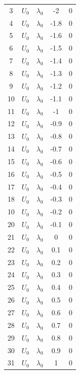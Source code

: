 \documentclass[12pt,letterpaper]{scrreprt}
\begin{document}
\begin{appendices}
\begin{table}[!ht]
{\begin{tabular}{c|c|c|c|c}
3   & $U_0$        & $\lambda_0$ & -2    & 0   \\
4   & $U_0$        & $\lambda_0$ & -1.8  & 0   \\
5   & $U_0$        & $\lambda_0$ & -1.6  & 0   \\
6   & $U_0$        & $\lambda_0$ & -1.5  & 0   \\
7   & $U_0$        & $\lambda_0$ & -1.4  & 0   \\
8   & $U_0$        & $\lambda_0$ & -1.3  & 0   \\
9  & $U_0$        & $\lambda_0$ & -1.2  & 0   \\
10  & $U_0$        & $\lambda_0$ & -1.1  & 0   \\
11  & $U_0$        & $\lambda_0$ & -1    & 0   \\
12  & $U_0$        & $\lambda_0$ & -0.9  & 0   \\
13  & $U_0$        & $\lambda_0$ & -0.8  & 0   \\
14  & $U_0$        & $\lambda_0$ & -0.7  & 0   \\
15  & $U_0$        & $\lambda_0$ & -0.6  & 0   \\
16  & $U_0$        & $\lambda_0$ & -0.5  & 0   \\
17  & $U_0$        & $\lambda_0$ & -0.4  & 0   \\
18  & $U_0$        & $\lambda_0$ & -0.3  & 0   \\
10  & $U_0$        & $\lambda_0$ & -0.2  & 0   \\
20  & $U_0$        & $\lambda_0$ & -0.1  & 0   \\
21  & $U_0$        & $\lambda_0$ & 0     & 0   \\
22 & $U_0$        & $\lambda_0$ & 0.1   & 0   \\
23  & $U_0$        & $\lambda_0$ & 0.2   & 0   \\
24  & $U_0$        & $\lambda_0$ & 0.3   & 0   \\
25  & $U_0$        & $\lambda_0$ & 0.4   & 0   \\
26  & $U_0$        & $\lambda_0$ & 0.5   & 0   \\
27  & $U_0$        & $\lambda_0$ & 0.6   & 0   \\
28  & $U_0$        & $\lambda_0$ & 0.7   & 0   \\
29  & $U_0$        & $\lambda_0$ & 0.8   & 0   \\
30  & $U_0$        & $\lambda_0$ & 0.9   & 0   \\
31  & $U_0$        & $\lambda_0$ & 1     & 0   \\

\end{tabular}}
\end{table}
\end{appendices}
\end{document}
